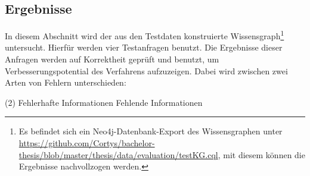 \subsection{Ergebnisse}%
\label{sec:evaluation:quality:results}

In diesem Abschnitt wird der aus den Testdaten konstruierte Wissensgraph\footnote{Es befindet sich ein Neo4j-Datenbank-Export des Wissensgraphen unter \url{https://github.com/Cortys/bachelor-thesis/blob/master/thesis/data/evaluation/testKG.cql}, mit diesem können die Ergebnisse nachvollzogen werden.} untersucht.
Hierfür werden vier Testanfragen benutzt.
Die Ergebnisse dieser Anfragen werden auf Korrektheit geprüft und benutzt, um Verbesserungspotential des Verfahrens aufzuzeigen.
Dabei wird zwischen zwei Arten von Fehlern unterschieden:
\newcommand{\errorA}{{\color{rot} (A)}}
\newcommand{\errorB}{{\color{blau} (B)}}
\begin{tasks}[label-offset=1em](2) %
	\task[\errorA] \color{rot}Fehlerhafte Informationen
	\task[\errorB] \color{blau}Fehlende Informationen
\end{tasks}

